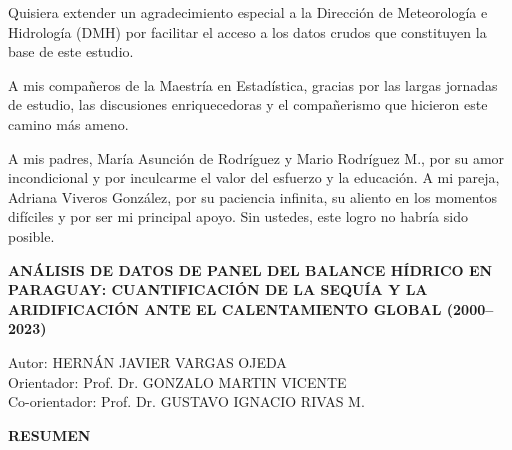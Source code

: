 \documentclass[12pt,a4paper,oneside]{book}
\begin{document}
\vspace{0.4cm}
Quisiera extender un agradecimiento especial a la Dirección de Meteorología e Hidrología (DMH) por facilitar el acceso a los datos crudos que constituyen la base de este estudio.

\vspace{0.4cm}
A mis compañeros de la Maestría en Estadística, gracias por las largas jornadas de estudio, las discusiones enriquecedoras y el compañerismo que hicieron este camino más ameno.

\vspace{0.4cm}
A mis padres, María Asunción de Rodríguez y Mario Rodríguez M., por su amor incondicional y por inculcarme el valor del esfuerzo y la educación. A mi pareja, Adriana Viveros González, por su paciencia infinita, su aliento en los momentos difíciles y por ser mi principal apoyo. Sin ustedes, este logro no habría sido posible.
\endgroup
\clearpage %

\clearpage
\thispagestyle{fancy} %

\begin{center}
    {\fontsize{13pt}{16pt}\selectfont\bfseries ANÁLISIS DE DATOS DE PANEL DEL BALANCE HÍDRICO EN PARAGUAY: CUANTIFICACIÓN DE LA SEQUÍA Y LA ARIDIFICACIÓN ANTE EL CALENTAMIENTO GLOBAL (2000–2023)\par}
\end{center}

\vspace{0.4cm}

\begin{flushright}
    \fontsize{12pt}{15pt}\selectfont
    Autor: HERNÁN JAVIER VARGAS OJEDA \\
    Orientador: Prof. Dr. GONZALO MARTIN VICENTE \\
    Co-orientador: Prof. Dr. GUSTAVO IGNACIO RIVAS M.
\end{flushright}

\vspace{0.5cm}

\begin{flushleft}
    {\fontsize{13pt}{16pt}\selectfont\bfseries RESUMEN\par}
\end{flushleft}
\end{document}
